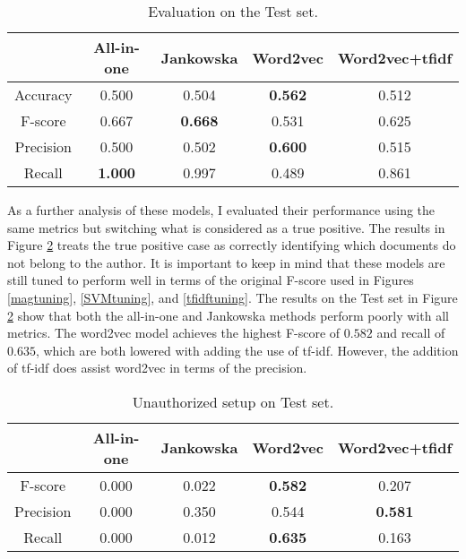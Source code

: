\documentclass[11pt]{article}
\begin{document}
\begin{table}
\begin{center}
\small
\setlength{\tabcolsep}{2pt}
\begin{tabular}{c|cccc}

&All-in-one & Jankowska & Word2vec & Word2vec+tfidf\\
\hline
Accuracy & 0.500 & 0.504 & \textbf{0.562} & 0.512 \\
F-score & 0.667 & \textbf{0.668} & 0.531 & 0.625 \\
Precision & 0.500 & 0.502 & \textbf{0.600} & 0.515 \\
Recall & \textbf{1.000} & 0.997 & 0.489 & 0.861\\
\hline


\end{tabular}
\caption{Evaluation on the Test set. \label{testResults}}
\end{center}
\end{table}

As a further analysis of these models, I evaluated their performance using the same metrics but switching what is considered as a true positive. The results in Figure \ref{unauthorized} treats the true positive case as correctly identifying which documents do not belong to the author. It is important to keep in mind that these models are still tuned to perform well in terms of the original F-score used in Figures \ref{magtuning}, \ref{SVMtuning}, and \ref{tfidftuning}. The results on the Test set in Figure \ref{unauthorized} show that both the all-in-one and Jankowska methods perform poorly with all metrics. The word2vec model achieves the highest F-score of $0.582$ and recall of $0.635$, which are both lowered with adding the use of tf-idf. However,  the addition of tf-idf does assist word2vec in terms of the precision. 

\begin{table}
\begin{center}
\small
\setlength{\tabcolsep}{2pt}
\begin{tabular}{c|cccc}

&All-in-one & Jankowska & Word2vec & Word2vec+tfidf\\
\hline
F-score & 0.000 & 0.022 & \textbf{0.582} & 0.207 \\
Precision & 0.000 & 0.350 & 0.544 & \textbf{0.581} \\
Recall & 0.000 & 0.012 & \textbf{0.635} & 0.163\\
\hline


\end{tabular}
\caption{Unauthorized setup on Test set. \label{unauthorized}}
\end{center}
\end{table}
\end{document}
